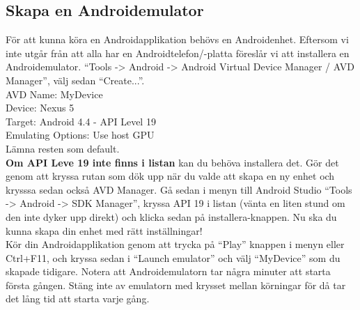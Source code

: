 \documentclass[11 pt, titlepage]{article} %
\begin{document}
\subsection{Skapa en Androidemulator}
För att kunna köra en Androidapplikation behövs en Androidenhet.
Eftersom vi inte utgår från att alla har en Androidtelefon/-platta föreslår vi att installera en Androidemulator.
“Tools -> Android -> Android Virtual Device Manager / AVD Manager”, välj sedan “Create...”.
\\
AVD Name: MyDevice\\
Device:  Nexus 5\\
Target:  Android 4.4 - API Level 19\\
Emulating Options:  Use host GPU\\
Lämna resten som default.\\

\textbf{Om API Leve 19 inte finns i listan} kan du behöva installera det.
Gör det genom att kryssa rutan som dök upp när du valde att skapa en ny enhet och krysssa sedan också AVD Manager.
Gå sedan i menyn till Android Studio “Tools -> Android -> SDK Manager”, kryssa API 19 i listan (vänta en liten stund om den inte dyker upp direkt) och klicka sedan på installera-knappen.
Nu ska du kunna skapa din enhet med rätt inställningar!\\

Kör din Androidapplikation genom att trycka på “Play” knappen i menyn eller Ctrl+F11, och kryssa sedan i ``Launch emulator'' och välj ``MyDevice'' som du skapade tidigare.
Notera att Androidemulatorn tar några minuter att starta första gången.
Stäng inte av emulatorn med krysset mellan körningar för då tar det lång tid att starta varje gång.
\end{document}
